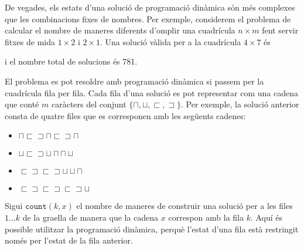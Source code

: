 De vegades, els estats d'una solució de programació dinàmica
són més complexes que les combinacions fixes de nombres.
Per exemple,
considerem el problema de calcular
el nombre de maneres diferents d'omplir
una cuadrícula $n \times m$ fent servir
fitxes de mida $1 \times 2$ i $2 \times 1$.
Una solució vàlida per a la cuadrícula $4 \times 7$ és
\begin{center}
\end{center}
i el nombre total de solucions és 781.

El problema es pot resoldre amb programació dinàmica
si passem per la cuadrícula fila per fila.
Cada fila d'una solució es pot representar com una
cadena que conté $m$ caràcters del conjunt
$\{\sqcap, \sqcup, \sqsubset, \sqsupset \}$.
Per exemple, la solució anterior consta de quatre files
que es corresponen amb les següents cadenes:
\begin{itemize}
\item
$\sqcap \sqsubset \sqsupset \sqcap \sqsubset \sqsupset \sqcap$
\item
$\sqcup \sqsubset \sqsupset \sqcup \sqcap \sqcap \sqcup$
\item
$\sqsubset \sqsupset \sqsubset \sqsupset \sqcup \sqcup \sqcap$
\item
$\sqsubset \sqsupset \sqsubset \sqsupset \sqsubset \sqsupset \sqcup$
\end{itemize}

Sigui $\texttt{count}(k,x)$ el nombre de maneres de construir
una solució per a les files $1 \ldots k$
de la graella de manera que la cadena $x$ correspon amb la fila $k$.
Aquí és possible utilitzar la programació dinàmica,
perquè l'estat d'una fila està restringit
només per l'estat de la fila anterior.

